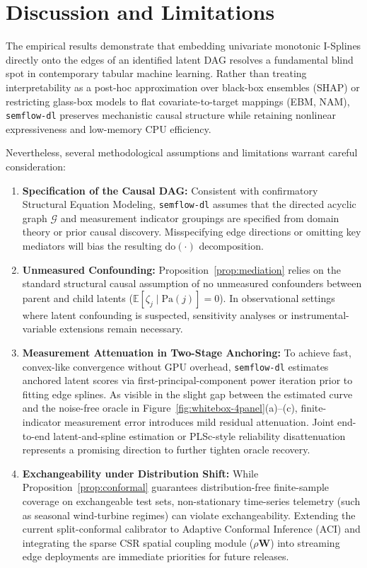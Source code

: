 \section{Discussion and Limitations}
\label{sec:discussion}

The empirical results demonstrate that embedding univariate monotonic I-Splines directly onto the edges of an identified latent DAG resolves a fundamental blind spot in contemporary tabular machine learning. Rather than treating interpretability as a post-hoc approximation over black-box ensembles (SHAP) or restricting glass-box models to flat covariate-to-target mappings (EBM, NAM), \texttt{semflow-dl} preserves mechanistic causal structure while retaining nonlinear expressiveness and low-memory CPU efficiency.

Nevertheless, several methodological assumptions and limitations warrant careful consideration:

\begin{enumerate}
  \item \textbf{Specification of the Causal DAG:} Consistent with confirmatory Structural Equation Modeling, \texttt{semflow-dl} assumes that the directed acyclic graph $\mathcal{G}$ and measurement indicator groupings are specified from domain theory or prior causal discovery. Misspecifying edge directions or omitting key mediators will bias the resulting $\mathrm{do}(\cdot)$ decomposition.
  \item \textbf{Unmeasured Confounding:} Proposition~\ref{prop:mediation} relies on the standard structural causal assumption of no unmeasured confounders between parent and child latents ($\mathbb{E}[\zeta_j \mid \mathrm{Pa}(j)] = 0$). In observational settings where latent confounding is suspected, sensitivity analyses or instrumental-variable extensions remain necessary.
  \item \textbf{Measurement Attenuation in Two-Stage Anchoring:} To achieve fast, convex-like convergence without GPU overhead, \texttt{semflow-dl} estimates anchored latent scores via first-principal-component power iteration prior to fitting edge splines. As visible in the slight gap between the estimated curve and the noise-free oracle in Figure~\ref{fig:whitebox-4panel}(a)--(c), finite-indicator measurement error introduces mild residual attenuation. Joint end-to-end latent-and-spline estimation or PLSc-style reliability disattenuation represents a promising direction to further tighten oracle recovery.
  \item \textbf{Exchangeability under Distribution Shift:} While Proposition~\ref{prop:conformal} guarantees distribution-free finite-sample coverage on exchangeable test sets, non-stationary time-series telemetry (such as seasonal wind-turbine regimes) can violate exchangeability. Extending the current split-conformal calibrator to Adaptive Conformal Inference (ACI) and integrating the sparse CSR spatial coupling module ($\rho\mathbf{W}$) into streaming edge deployments are immediate priorities for future releases.
\end{enumerate}

